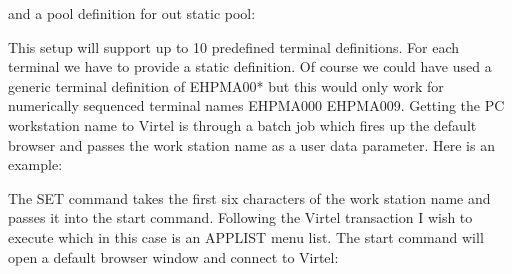 \documentclass[letterpaper,10pt,english]{sphinxmanual}
\begin{document}
and a pool definition for out static pool:

\begin{sphinxVerbatim}[commandchars=\\\{\}]
  
 
 
 
 
 
 
\end{sphinxVerbatim}

This setup will support up to 10 predefined terminal definitions. For each terminal we have to provide a static definition. Of course we could have used a generic terminal definition of EHPMA00* but this would only work for numerically sequenced terminal names \textendash{} EHPMA000 \textendash{} EHPMA009. Getting the PC workstation name to Virtel is through a batch job which fires up the default browser and passes the work station name as a user data parameter. Here is an example:

\begin{sphinxVerbatim}[commandchars=\\\{\}]
     
 
 
 
  
\end{sphinxVerbatim}


The SET command takes the first six characters of the work station name and passes it into the start command. Following the Virtel transaction I wish to execute which in this case is an APPLIST menu list. The start command will open a default browser window and connect to Virtel:
\end{document}
